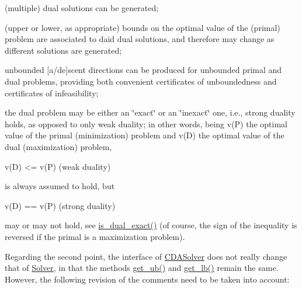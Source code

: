 \begin{DoxyItemize}
\item (multiple) dual solutions can be generated;
\item (upper or lower, as appropriate) bounds on the optimal value of the (primal) problem are associated to daid dual solutions, and therefore may change as different solutions are generated;
\item unbounded \mbox{[}a/de\mbox{]}scent directions can be produced for unbounded primal and dual problems, providing both convenient certificates of unboundedness and certificates of infeasibility;
\item the dual problem may be either an \char`\"{}exact\char`\"{} or an \char`\"{}inexact\char`\"{} one, i.\+e., strong duality holds, as opposed to only weak duality; in other words, being v(\+P) the optimal value of the primal (minimization) problem and v(\+D) the optimal value of the dual (maximization) problem, \begin{DoxyVerb}v(D) <= v(P)      (weak duality)
\end{DoxyVerb}


is always assumed to hold, but \begin{DoxyVerb}v(D) == v(P)      (strong duality)
\end{DoxyVerb}


may or may not hold, see \mbox{\hyperlink{class_s_m_spp__di__unipi__it_1_1_c_d_a_solver_a402db4cab5024abd480ae2186cf467cc}{is\+\_\+dual\+\_\+exact()}} (of course, the sign of the inequality is reversed if the primal is a maximization problem).
\end{DoxyItemize}

Regarding the second point, the interface of \mbox{\hyperlink{class_s_m_spp__di__unipi__it_1_1_c_d_a_solver}{C\+D\+A\+Solver}} does not really change that of \mbox{\hyperlink{class_s_m_spp__di__unipi__it_1_1_solver}{Solver}}, in that the methods \mbox{\hyperlink{class_s_m_spp__di__unipi__it_1_1_solver_a7304d819b2eeff3d4ba650055b24e3a5}{get\+\_\+ub()}} and \mbox{\hyperlink{class_s_m_spp__di__unipi__it_1_1_solver_a4a4dbe4c2416d531c4619ca94fc07d31}{get\+\_\+lb()}} remain the same. However, the following revision of the comments need to be taken into account\+:


